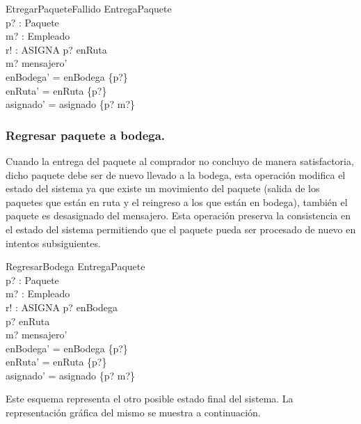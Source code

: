 \documentclass[12pt,a4paper]{article}
\begin{document}
\begin{enumerate}
\begin{schema}{EtregarPaqueteFallido}
\Xi EntregaPaquete\\
p? : Paquete\\
m? : Empleado\\
r! : ASIGNA
\where
p? \notin  enRuta\\
m? \in mensajero'\\
enBodega' = enBodega \setminus \{p?\}\\
enRuta' = enRuta \cup \{p?\}\\
asignado' = asignado \cup \{p? \mapsto m?\}
\end{schema}

\end{enumerate}

\subsubsection{Regresar paquete a bodega.}
Cuando la entrega del paquete al comprador no concluyo de manera satisfactoria, dicho paquete debe ser de nuevo llevado a la bodega, esta operación modifica el estado del sistema ya que existe un movimiento del paquete (salida de los paquetes que están en ruta y el reingreso a los que están en bodega), también el paquete es desasignado del mensajero. Esta operación preserva la consistencia en el estado del sistema permitiendo que el paquete pueda ser procesado de nuevo en intentos subsiguientes.

\begin{schema}{RegresarBodega}
\Xi EntregaPaquete\\
p? : Paquete\\
m? : Empleado\\
r! : ASIGNA
\where
p? \in enBodega\\
p? \notin  enRuta\\
m? \in mensajero'\\
enBodega' = enBodega \setminus \{p?\}\\
enRuta' = enRuta \cup \{p?\}\\
asignado' = asignado \cup \{p? \mapsto m?\}
\end{schema}

Este esquema representa el otro posible estado final del sistema. La representación gráfica del mismo se muestra a continuación. 
\end{document}
